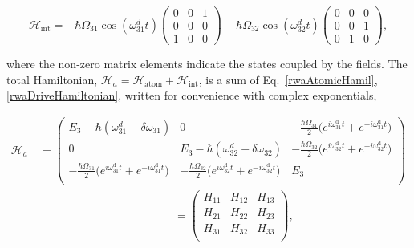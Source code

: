   \begin{equation}
    \mathcal{H}_{\text{int}} = -\hbar\Omega_{31}\cos(\omega_{31}^{d}t) \begin{pmatrix}
      0 & 0 & 1\\0&0&0\\1&0&0
    \end{pmatrix}-\hbar\Omega_{32}\cos(\omega_{32}^{d}t) \begin{pmatrix}
      0 & 0 & 0\\0&0&1\\0&1&0
    \end{pmatrix},
    \label{rwaDriveHamiltonian}
  \end{equation}

  \noindent  where the  non-zero  matrix elements  indicate the  states
  coupled     by     the     fields.     The     total     Hamiltonian,
  $                          \mathcal{H}_{a}                          =
  \mathcal{H}_{\text{atom}}+\mathcal{H}_{\text{int}}$,  is   a  sum  of
  Eq.~\eqref{rwaAtomicHamil}, \eqref{rwaDriveHamiltonian},  written for
  convenience with complex exponentials,

  {\small \begin{equation}
      \begin{aligned}
        \mathcal{H}_{a}\ & {= \begin{pmatrix}
            E_3-\hbar(\omega_{31}^{d}-\delta\omega_{31}) & 0 & -\frac{\hbar\Omega_{31}}{2}\bigg(e^{i\omega^{\text{d}}_{31}t}+e^{-i\omega^{\text{d}}_{31}t}\bigg)  \\    0 & E_3-\hbar(\omega_{32}^{d}-\delta\omega_{32})  & -\frac{\hbar\Omega_{32}}{2}\bigg(e^{i\omega^{\text{d}}_{32}t}+e^{-i\omega^{\text{d}}_{32}t}\bigg)  \\     -\frac{\hbar\Omega_{31}}{2}\bigg(e^{i\omega^{\text{d}}_{31}t}+e^{-i\omega^{\text{d}}_{31}t}\bigg)  & -\frac{\hbar\Omega_{32}}{2}\bigg(e^{i\omega^{\text{d}}_{32}t}+e^{-i\omega^{\text{d}}_{32}t}\bigg) & E_3 \\
          \end{pmatrix}}\\&        \qquad\qquad\qquad\qquad\qquad\qquad
        = \begin{pmatrix}
          H_{11} & H_{12} & H_{13} \\     H_{21} & H_{22} & H_{23} \\     H_{31} & H_{32} & H_{33} \\
        \end{pmatrix},
      \end{aligned}
      \label{rwaTotalHamiltonian}
    \end{equation}}

